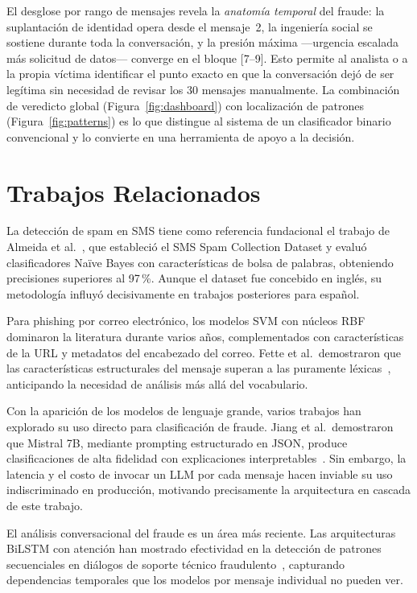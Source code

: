 \documentclass{llncs}
\begin{document}
El desglose por rango de mensajes revela la \emph{anatomía temporal}
del fraude: la suplantación de identidad opera desde el mensaje~2,
la ingeniería social se sostiene durante toda la conversación, y la
presión máxima ---urgencia escalada más solicitud de datos--- converge
en el bloque [7--9].
Esto permite al analista o a la propia víctima identificar el punto
exacto en que la conversación dejó de ser legítima sin necesidad de
revisar los 30 mensajes manualmente.
La combinación de veredicto global (Figura~\ref{fig:dashboard}) con
localización de patrones (Figura~\ref{fig:patterns}) es lo que
distingue al sistema de un clasificador binario convencional y lo
convierte en una herramienta de apoyo a la decisión.

\section{Trabajos Relacionados}
\label{sec:related}

La detección de spam en SMS tiene como referencia fundacional el
trabajo de Almeida et al.~\cite{almeida2011}, que estableció el
SMS Spam Collection Dataset y evaluó clasificadores Naïve Bayes
con características de bolsa de palabras, obteniendo precisiones
superiores al 97\,\%.
Aunque el dataset fue concebido en inglés, su metodología influyó
decisivamente en trabajos posteriores para español.

Para phishing por correo electrónico, los modelos SVM con núcleos
RBF~\cite{cortes1995} dominaron la literatura durante varios años,
complementados con características de la URL y metadatos del
encabezado del correo.
Fette et al.\ demostraron que las características estructurales
del mensaje superan a las puramente léxicas~\cite{fette2007},
anticipando la necesidad de análisis más allá del vocabulario.

Con la aparición de los modelos de lenguaje grande, varios trabajos
han explorado su uso directo para clasificación de fraude.
Jiang et al.\ demostraron que Mistral 7B, mediante prompting
estructurado en JSON, produce clasificaciones de alta fidelidad
con explicaciones interpretables~\cite{jiang2023mistral}.
Sin embargo, la latencia y el costo de invocar un LLM por cada
mensaje hacen inviable su uso indiscriminado en producción,
motivando precisamente la arquitectura en cascada de este trabajo.

El análisis conversacional del fraude es un área más reciente.
Las arquitecturas BiLSTM con atención han mostrado efectividad
en la detección de patrones secuenciales en diálogos de soporte
técnico fraudulento~\cite{hochreiter1997}, capturando dependencias
temporales que los modelos por mensaje individual no pueden ver.
\end{document}
